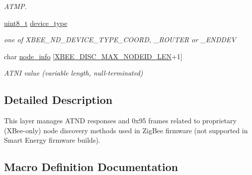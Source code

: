 \begin{DoxyCompactItemize}
\begin{DoxyCompactList}\small\item\em A\+T\+MP. \end{DoxyCompactList}\item 
\mbox{\label{group__xbee__discovery_gab9c960832b7e834e6657e0c6ab4c3d8a}} 
\hyperlink{group__hal__dos_gae1affc9ca37cfb624959c866a73f83c2}{uint8\+\_\+t} \hyperlink{group__xbee__discovery_gab9c960832b7e834e6657e0c6ab4c3d8a}{device\+\_\+type}
\begin{DoxyCompactList}\small\item\em one of X\+B\+E\+E\+\_\+\+N\+D\+\_\+\+D\+E\+V\+I\+C\+E\+\_\+\+T\+Y\+P\+E\+\_\+\+C\+O\+O\+RD, \+\_\+\+R\+O\+U\+T\+ER or \+\_\+\+E\+N\+D\+D\+EV \end{DoxyCompactList}\item 
\mbox{\label{group__xbee__discovery_gaa667bab3abb953bc14d9f5bcc36644b8}} 
char \hyperlink{group__xbee__discovery_gaa667bab3abb953bc14d9f5bcc36644b8}{node\+\_\+info} \mbox{[}\hyperlink{group__xbee__discovery_ga0df6e63d6ccca22fcf154b6f0be46da6}{X\+B\+E\+E\+\_\+\+D\+I\+S\+C\+\_\+\+M\+A\+X\+\_\+\+N\+O\+D\+E\+I\+D\+\_\+\+L\+EN}+1\mbox{]}
\begin{DoxyCompactList}\small\item\em A\+T\+NI value (variable length, null-\/terminated) \end{DoxyCompactList}\end{DoxyCompactItemize}


\subsection{Detailed Description}
This layer manages A\+T\+ND responses and 0x95 frames related to proprietary (X\+Bee-\/only) node discovery methods used in Zig\+Bee firmware (not supported in Smart Energy firmware builds). 



\subsection{Macro Definition Documentation}
\mbox{\label{group__xbee__discovery_ga8f678e29b22812632df7d3fa3d0f951a}} 

